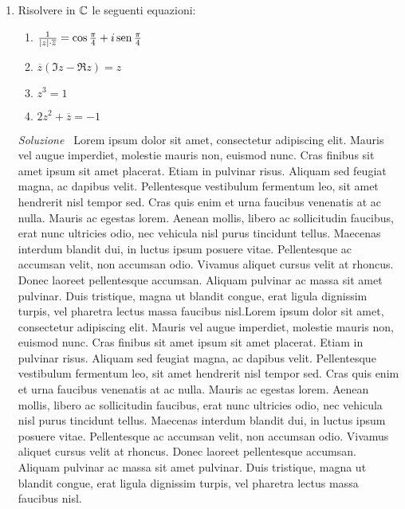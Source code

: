 \documentclass{article}
\begin{document}
\begin{enumerate}[label=\textbf{Esercizio 3.\arabic*.},itemindent=*]
    \item Risolvere in $\mathbb{C}$ le seguenti equazioni: 
        \begin{enumerate}
            \item $\frac{1}{|z|\cdot \overline{z}}=\cos\frac{\pi}{4}+i\text{\textnormal{\,sen\,}} \frac{\pi}{4}$
            \item $\overline{z}(\Im z-\Re z)=z$
            \item $z^3=1$
            \item $2z^2+\overline{z}=-1$
        \end{enumerate}
    \item[\textit{\large Soluzione~}]
    Lorem ipsum dolor sit amet, consectetur adipiscing elit. Mauris vel augue imperdiet, molestie mauris non, euismod nunc. Cras finibus sit amet ipsum sit amet placerat. Etiam in pulvinar risus. Aliquam sed feugiat magna, ac dapibus velit. Pellentesque vestibulum fermentum leo, sit amet hendrerit nisl tempor sed. Cras quis enim et urna faucibus venenatis at ac nulla. Mauris ac egestas lorem. Aenean mollis, libero ac sollicitudin faucibus, erat nunc ultricies odio, nec vehicula nisl purus tincidunt tellus. Maecenas interdum blandit dui, in luctus ipsum posuere vitae. Pellentesque ac accumsan velit, non accumsan odio. Vivamus aliquet cursus velit at rhoncus. Donec laoreet pellentesque accumsan. Aliquam pulvinar ac massa sit amet pulvinar. Duis tristique, magna ut blandit congue, erat ligula dignissim turpis, vel pharetra lectus massa faucibus nisl.Lorem ipsum dolor sit amet, consectetur adipiscing elit. Mauris vel augue imperdiet, molestie mauris non, euismod nunc. Cras finibus sit amet ipsum sit amet placerat. Etiam in pulvinar risus. Aliquam sed feugiat magna, ac dapibus velit. Pellentesque vestibulum fermentum leo, sit amet hendrerit nisl tempor sed. Cras quis enim et urna faucibus venenatis at ac nulla. Mauris ac egestas lorem. Aenean mollis, libero ac sollicitudin faucibus, erat nunc ultricies odio, nec vehicula nisl purus tincidunt tellus. Maecenas interdum blandit dui, in luctus ipsum posuere vitae. Pellentesque ac accumsan velit, non accumsan odio. Vivamus aliquet cursus velit at rhoncus. Donec laoreet pellentesque accumsan. Aliquam pulvinar ac massa sit amet pulvinar. Duis tristique, magna ut blandit congue, erat ligula dignissim turpis, vel pharetra lectus massa faucibus nisl.


\end{enumerate}
\end{document}
